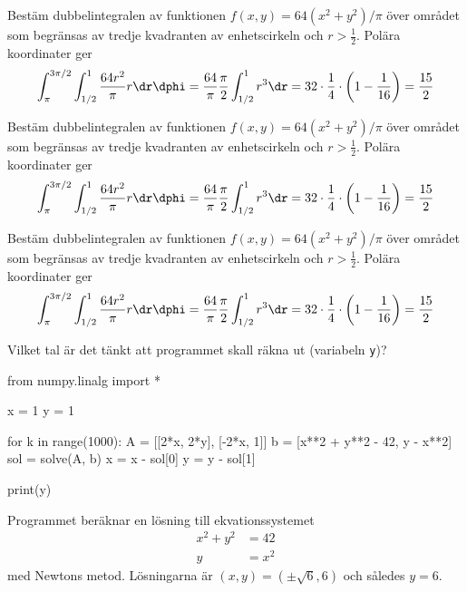 Bestäm dubbelintegralen av funktionen $f(x, y) = 64(x^2 + y^2)/\pi$ över området
som begränsas av tredje kvadranten av enhets\-cirkeln och $r > \tfrac12$.
Polära koordinater ger
\begin{align*}
  \int_{\pi}^{3\pi/2}\int_{1/2}^1 \frac{64r^2}{\pi} r\dr\dphi
  = \frac{64}{\pi}\frac{\pi}{2} \int_{1/2}^1 r^3\dr
  = 32 \cdot \frac{1}{4} \cdot \left(1 - \frac1{16}\right) = \frac{15}2
\end{align*}
%

Bestäm dubbelintegralen av funktionen $f(x, y) = 64(x^2 + y^2)/\pi$ över området
som begränsas av tredje kvadranten av enhets\-cirkeln och $r > \tfrac12$.
Polära koordinater ger
\begin{align*}
  \int_{\pi}^{3\pi/2}\int_{1/2}^1 \frac{64r^2}{\pi} r\dr\dphi
  = \frac{64}{\pi}\frac{\pi}{2} \int_{1/2}^1 r^3\dr
  = 32 \cdot \frac{1}{4} \cdot \left(1 - \frac1{16}\right) = \frac{15}2
\end{align*}
%

Bestäm dubbelintegralen av funktionen $f(x, y) = 64(x^2 + y^2)/\pi$ över området
som begränsas av tredje kvadranten av enhets\-cirkeln och $r > \tfrac12$.
Polära koordinater ger
\begin{align*}
  \int_{\pi}^{3\pi/2}\int_{1/2}^1 \frac{64r^2}{\pi} r\dr\dphi
  = \frac{64}{\pi}\frac{\pi}{2} \int_{1/2}^1 r^3\dr
  = 32 \cdot \frac{1}{4} \cdot \left(1 - \frac1{16}\right) = \frac{15}2
\end{align*}
%

Vilket tal är det tänkt att programmet skall räkna ut (variabeln \texttt{y})? \\
\begin{python}
from numpy.linalg import *

x = 1
y = 1

for k in range(1000):
    A = [[2*x, 2*y], [-2*x, 1]]
    b = [x**2 + y**2 - 42, y - x**2]
    sol = solve(A, b)
    x = x - sol[0]
    y = y - sol[1]

print(y)
\end{python}
Programmet beräknar en lösning till ekvationssystemet
\begin{align*}
  x^2 + y^2 &= 42 \\
  y &= x^2
\end{align*}
med Newtons metod. Lösningarna är $(x, y) = (\pm\sqrt{6}, 6)$ och således $y = 6
$.
